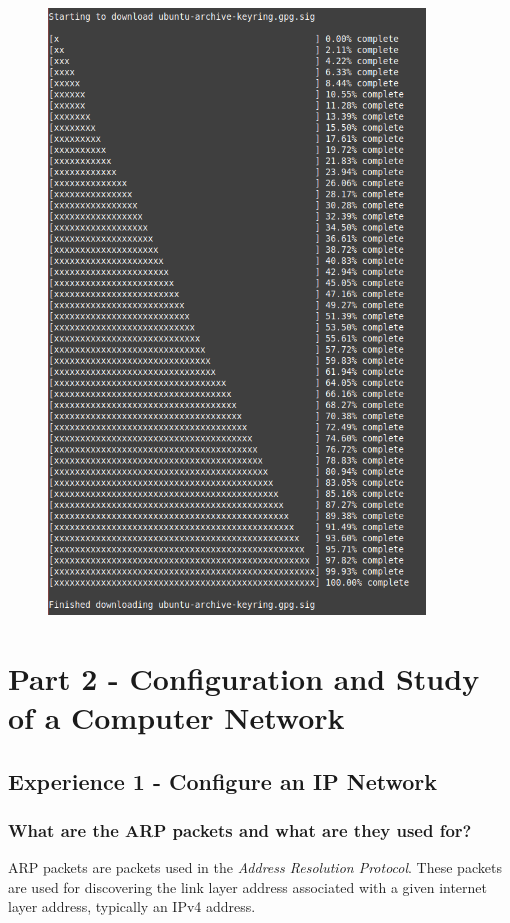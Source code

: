 \documentclass[11pt]{report}
\begin{document}
\begin{figure}[h!]
\includegraphics[width=10cm]{images/download_example2.png}
\end{figure}

\chapter{Part 2 - Configuration and Study of a Computer Network}

\section{Experience 1 - Configure an IP Network}

\subsection{What are the ARP packets and what are they used for?}

ARP packets are packets used in the \textit{Address Resolution Protocol}. These packets are used for discovering the link layer address associated with a given internet layer address, typically an IPv4 address.
\end{document}
